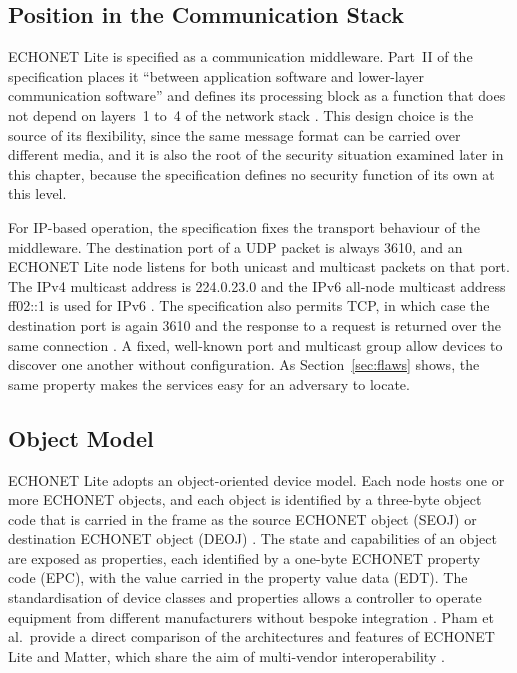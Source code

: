 \subsection{Position in the Communication Stack}
\label{sec:echonet-stack}

ECHONET Lite is specified as a communication middleware. Part~II of the specification places it ``between application software and lower-layer communication software'' and defines its processing block as a function that does not depend on layers~1 to~4 of the network stack \cite{ECHONETPart2}. This design choice is the source of its flexibility, since the same message format can be carried over different media, and it is also the root of the security situation examined later in this chapter, because the specification defines no security function of its own at this level.

For IP-based operation, the specification fixes the transport behaviour of the middleware. The destination port of a UDP packet is always 3610, and an ECHONET Lite node listens for both unicast and multicast packets on that port. The IPv4 multicast address is 224.0.23.0 and the IPv6 all-node multicast address ff02::1 is used for IPv6 \cite{ECHONETPart2}. The specification also permits TCP, in which case the destination port is again 3610 and the response to a request is returned over the same connection \cite{ECHONETPart2}. A fixed, well-known port and multicast group allow devices to discover one another without configuration. As Section~\ref{sec:flaws} shows, the same property makes the services easy for an adversary to locate.

\subsection{Object Model}

ECHONET Lite adopts an object-oriented device model. Each node hosts one or more ECHONET objects, and each object is identified by a three-byte object code that is carried in the frame as the source ECHONET object (SEOJ) or destination ECHONET object (DEOJ) \cite{ECHONETPart2}. The state and capabilities of an object are exposed as properties, each identified by a one-byte ECHONET property code (EPC), with the value carried in the property value data (EDT). The standardisation of device classes and properties allows a controller to operate equipment from different manufacturers without bespoke integration \cite{murakamiApplicationECHONETLite2016,phamMatterECHONETLite2024}. Pham et al.\ provide a direct comparison of the architectures and features of ECHONET Lite and Matter, which share the aim of multi-vendor interoperability \cite{phamMatterECHONETLite2024}.


